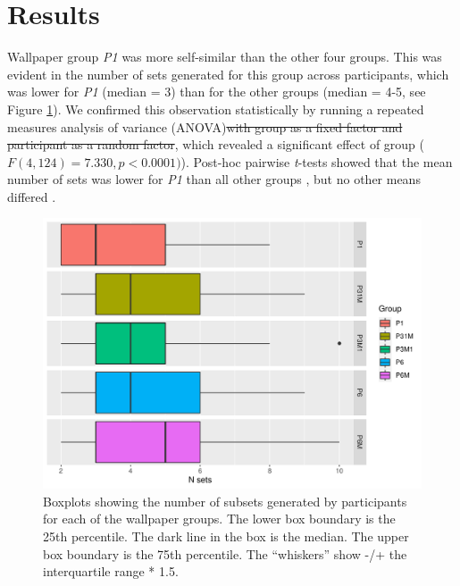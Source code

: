 \documentclass[11pt, twoside]{article}
\providecommand{\DIFaddtex}[1]{{\protect\color{blue}\uwave{#1}}} %
\providecommand{\DIFdeltex}[1]{{\protect\color{red}\sout{#1}}}                      %
\providecommand{\DIFaddbegin}{} %
\providecommand{\DIFaddend}{} %
\providecommand{\DIFdelbegin}{} %
\providecommand{\DIFdelend}{} %
\providecommand{\DIFadd}[1]{\texorpdfstring{\DIFaddtex{#1}}{#1}} %
\providecommand{\DIFdel}[1]{\texorpdfstring{\DIFdeltex{#1}}{}} %
\newcommand{\DIFscaledelfig}{0.5}
\newlength{\DIFdelgraphicswidth} %
\newlength{\DIFdelgraphicsheight} %
\newcommand{\DIFaddincludegraphics}[2][]{{\color{blue}\fbox{\DIFOincludegraphics[#1]{#2}}}} %
\newcommand{\DIFdelincludegraphics}[2][]{%
\sbox{\DIFdelgraphicsbox}{\DIFOincludegraphics[#1]{#2}}%
\settoboxwidth{\DIFdelgraphicswidth}{\DIFdelgraphicsbox} %
\settoboxtotalheight{\DIFdelgraphicsheight}{\DIFdelgraphicsbox} %
\scalebox{\DIFscaledelfig}{%
\parbox[b]{\DIFdelgraphicswidth}{\usebox{\DIFdelgraphicsbox}\\[-\baselineskip] \rule{\DIFdelgraphicswidth}{0em}}\llap{\resizebox{\DIFdelgraphicswidth}{\DIFdelgraphicsheight}{%
\setlength{\unitlength}{\DIFdelgraphicswidth}%
\begin{picture}(1,1)%
\thicklines\linethickness{2pt} %
{\color[rgb]{1,0,0}\put(0,0){\framebox(1,1){}}}%
{\color[rgb]{1,0,0}\put(0,0){\line( 1,1){1}}}%
{\color[rgb]{1,0,0}\put(0,1){\line(1,-1){1}}}%
\end{picture}%
}\hspace*{3pt}}} %
} %
\DeclareRobustCommand{\DIFaddbegin}{\DIFOaddbegin \let\includegraphics\DIFaddincludegraphics} %
\DeclareRobustCommand{\DIFaddend}{\DIFOaddend \let\includegraphics\DIFOincludegraphics} %
\DeclareRobustCommand{\DIFdelbegin}{\DIFOdelbegin \let\includegraphics\DIFdelincludegraphics} %
\DeclareRobustCommand{\DIFdelend}{\DIFOaddend \let\includegraphics\DIFOincludegraphics} %
\begin{document}
\section*{Results}
Wallpaper group \textit{P1} was more self-similar than the other four groups. This was evident in the number of sets generated for this group across participants, which was lower for \textit{P1} (median = 3) than for the \DIFaddbegin \DIFadd{four }\DIFaddend other groups (median = 4-5, see Figure \ref{fig:n_sets_summary}). We confirmed this observation statistically by running a repeated measures analysis of variance (ANOVA)\DIFdelbegin \DIFdel{with group as a fixed factor and participant as a random factor}\DIFdelend , which revealed a significant effect of group ($F(4, 124) = 7.330, p < 0.0001)$). Post-hoc pairwise \textit{t}-tests showed that the mean number of sets was lower for \textit{P1} than all other groups \DIFaddbegin \DIFadd{($ps < 0.0001$)}\DIFaddend , but no other means differed \DIFaddbegin \DIFadd{(see Table \ref{table:t-stats})}\DIFaddend .
\begin{figure}[t]
	\centering
	\includegraphics[width=\linewidth]{./figures/nsets_summary.pdf}
	\caption{Boxplots showing the number of subsets generated by participants for each of the wallpaper groups. The lower box boundary is the 25th percentile. The dark line in the box is the median. The upper box boundary is the 75th percentile. The “whiskers” show -/+ the interquartile range * 1.5.}
	\label{fig:n_sets_summary}
\end{figure}
\end{document}
